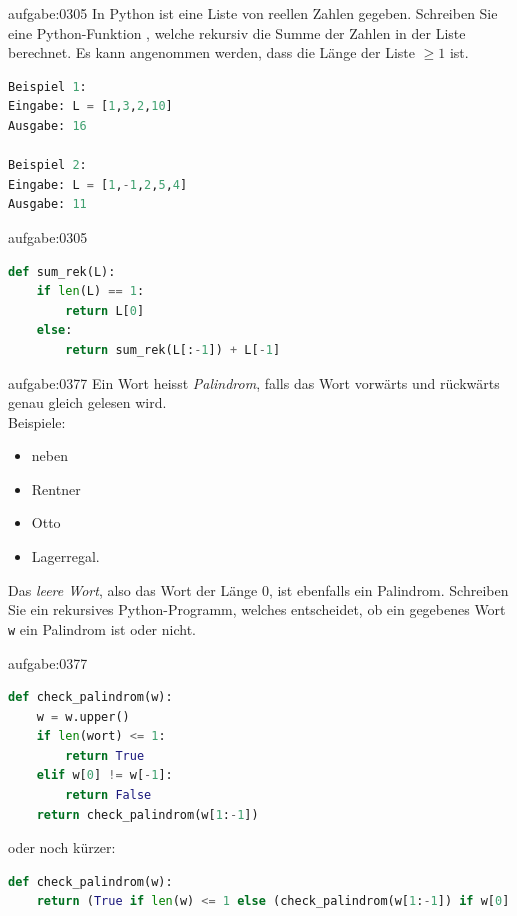 \clearpage
\begin{aufgabe}{aufgabe:0305}
In Python ist eine Liste  von reellen Zahlen gegeben. Schreiben Sie eine Python-Funktion , welche rekursiv die Summe der Zahlen in der Liste berechnet. Es kann angenommen werden, dass die Länge der Liste $\geq 1$ ist.
\begin{lstlisting}[language=Python]
Beispiel 1:
Eingabe: L = [1,3,2,10]
Ausgabe: 16

Beispiel 2:
Eingabe: L = [1,-1,2,5,4]
Ausgabe: 11

\end{lstlisting}
\end{aufgabe}
\begin{antwort}{aufgabe:0305}
\begin{lstlisting}[language=Python]
def sum_rek(L):
    if len(L) == 1:
        return L[0]
    else:
        return sum_rek(L[:-1]) + L[-1]
\end{lstlisting}
\end{antwort}


\begin{aufgabe}{aufgabe:0377}
Ein Wort heisst \textit{Palindrom}, falls das Wort vorwärts und rückwärts genau gleich gelesen wird.\\
Beispiele:
\begin{itemize}
    \item neben
    \item Rentner
    \item Otto
    \item Lagerregal.
\end{itemize}
Das \textit{leere Wort}, also das Wort der Länge $0$, ist ebenfalls ein Palindrom. Schreiben Sie ein rekursives Python-Programm, welches entscheidet, ob ein gegebenes Wort \verb|w| ein Palindrom ist oder nicht.
\end{aufgabe}

\begin{antwort}{aufgabe:0377}
\begin{lstlisting}[language=Python]
def check_palindrom(w):
    w = w.upper()
    if len(wort) <= 1:
        return True
    elif w[0] != w[-1]:
        return False
    return check_palindrom(w[1:-1])
\end{lstlisting}
oder noch kürzer:
\begin{lstlisting}[language=Python]
def check_palindrom(w):
    return (True if len(w) <= 1 else (check_palindrom(w[1:-1]) if w[0].lower() == w[-1].lower() else False))
\end{lstlisting}
\end{antwort}

